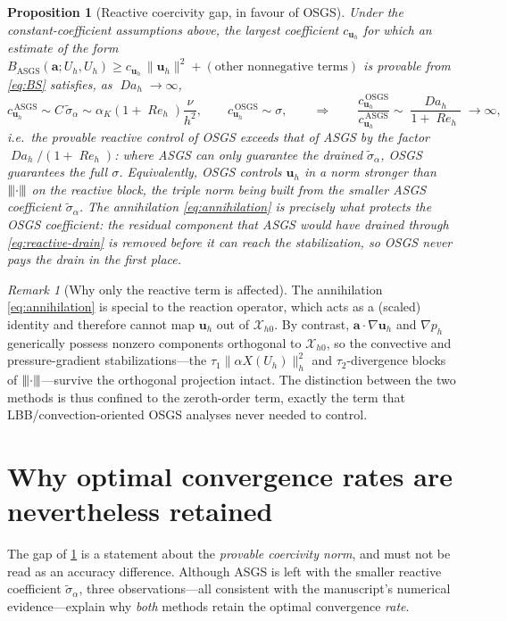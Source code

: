 \documentclass[11pt]{article}
\newcommand{\Reyn}{\operatorname{\mathit{Re}}}
\newcommand{\Damk}{\operatorname{\mathit{Da}}}
\newcommand{\triplenorm}[1]{{\lvert\kern-0.25ex\lvert\kern-0.25ex\lvert #1
\rvert\kern-0.25ex\rvert\kern-0.25ex\rvert}}
\theoremstyle{plain}
\newtheorem{proposition}{Proposition}
\theoremstyle{remark}
\newtheorem{remark}{Remark}
\newcommand{\uh}{\boldsymbol{u}_h}
\newcommand{\ph}{p_h}
\newcommand{\Uh}{U_h}
\newcommand{\Xh}{\mathcal{X}_{h0}}
\newcommand{\siga}{\widetilde{\sigma}_\alpha}
\begin{document}
\begin{proposition}[Reactive coercivity gap, in favour of OSGS]\label{prop:gap}
Under the constant-coefficient assumptions above, the largest coefficient
$c_{\uh}$ for which an estimate of the form
$B_{\mathrm{ASGS}}(\boldsymbol{a};\Uh,\Uh)\ge c_{\uh}\,\|\uh\|^2+(\text{other nonnegative terms})$
is provable from \cref{eq:BS} satisfies, as $\Damk_h\to\infty$,
\begin{equation}\label{eq:gap}
  c_{\uh}^{\,\mathrm{ASGS}}\sim C\,\siga\sim\alpha_K(1+\Reyn_h)\frac{\nu}{h^2},
  \qquad
  c_{\uh}^{\,\mathrm{OSGS}}\sim \sigma,
  \qquad\Longrightarrow\qquad
  \frac{c_{\uh}^{\,\mathrm{OSGS}}}{c_{\uh}^{\,\mathrm{ASGS}}}\sim\frac{\Damk_h}{1+\Reyn_h}\to\infty,
\end{equation}
i.e.\ the provable reactive control of OSGS \emph{exceeds} that of ASGS by the
factor $\Damk_h/(1+\Reyn_h)$: where ASGS can only guarantee the drained $\siga$,
OSGS guarantees the full $\sigma$. Equivalently, OSGS controls $\uh$ in a norm
\emph{stronger} than $\triplenorm{\cdot}$ on the reactive block, the triple norm
being built from the smaller ASGS coefficient $\siga$. The annihilation
\eqref{eq:annihilation} is precisely what protects the OSGS coefficient: the
residual component that ASGS would have drained through \cref{eq:reactive-drain} is
removed before it can reach the stabilization, so OSGS never pays the drain in the
first place.
\end{proposition}

\begin{remark}[Why only the reactive term is affected]
The annihilation \eqref{eq:annihilation} is special to the reaction operator,
which acts as a (scaled) identity and therefore cannot map $\uh$ out of $\Xh$. By
contrast, $\boldsymbol{a}\cdot\nabla\uh$ and $\nabla\ph$ generically possess
nonzero components orthogonal to $\Xh$, so the convective and pressure-gradient
stabilizations---the $\tau_1\|\alpha X(\Uh)\|_h^2$ and $\tau_2$-divergence blocks
of $\triplenorm{\cdot}$---survive the orthogonal projection intact. The distinction
between the two methods is thus confined to the zeroth-order term, exactly the term
that LBB/convection-oriented OSGS analyses never needed to control.
\end{remark}

\section{Why optimal convergence rates are nevertheless retained}
The gap of \cref{prop:gap} is a statement about the \emph{provable coercivity
norm}, and must not be read as an accuracy difference. Although ASGS is left with
the smaller reactive coefficient $\siga$, three observations---all consistent with
the manuscript's numerical evidence---explain why \emph{both} methods retain the
optimal convergence \emph{rate}.
\end{document}
